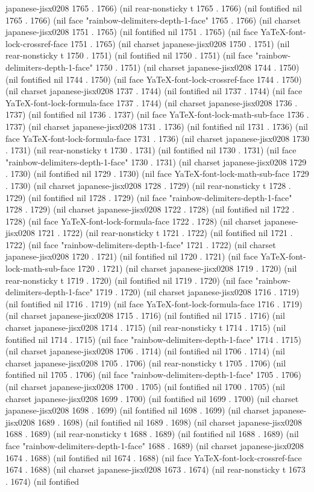 japanese-jisx0208 1765 . 1766) (nil rear-nonsticky t 1765 . 1766) (nil fontified nil 1765 . 1766) (nil face "rainbow-delimiters-depth-1-face" 1765 . 1766) (nil charset japanese-jisx0208 1751 . 1765) (nil fontified nil 1751 . 1765) (nil face YaTeX-font-lock-crossref-face 1751 . 1765) (nil charset japanese-jisx0208 1750 . 1751) (nil rear-nonsticky t 1750 . 1751) (nil fontified nil 1750 . 1751) (nil face "rainbow-delimiters-depth-1-face" 1750 . 1751) (nil charset japanese-jisx0208 1744 . 1750) (nil fontified nil 1744 . 1750) (nil face YaTeX-font-lock-crossref-face 1744 . 1750) (nil charset japanese-jisx0208 1737 . 1744) (nil fontified nil 1737 . 1744) (nil face YaTeX-font-lock-formula-face 1737 . 1744) (nil charset japanese-jisx0208 1736 . 1737) (nil fontified nil 1736 . 1737) (nil face YaTeX-font-lock-math-sub-face 1736 . 1737) (nil charset japanese-jisx0208 1731 . 1736) (nil fontified nil 1731 . 1736) (nil face YaTeX-font-lock-formula-face 1731 . 1736) (nil charset japanese-jisx0208 1730 . 1731) (nil rear-nonsticky t 1730 . 1731) (nil fontified nil 1730 . 1731) (nil face "rainbow-delimiters-depth-1-face" 1730 . 1731) (nil charset japanese-jisx0208 1729 . 1730) (nil fontified nil 1729 . 1730) (nil face YaTeX-font-lock-math-sub-face 1729 . 1730) (nil charset japanese-jisx0208 1728 . 1729) (nil rear-nonsticky t 1728 . 1729) (nil fontified nil 1728 . 1729) (nil face "rainbow-delimiters-depth-1-face" 1728 . 1729) (nil charset japanese-jisx0208 1722 . 1728) (nil fontified nil 1722 . 1728) (nil face YaTeX-font-lock-formula-face 1722 . 1728) (nil charset japanese-jisx0208 1721 . 1722) (nil rear-nonsticky t 1721 . 1722) (nil fontified nil 1721 . 1722) (nil face "rainbow-delimiters-depth-1-face" 1721 . 1722) (nil charset japanese-jisx0208 1720 . 1721) (nil fontified nil 1720 . 1721) (nil face YaTeX-font-lock-math-sub-face 1720 . 1721) (nil charset japanese-jisx0208 1719 . 1720) (nil rear-nonsticky t 1719 . 1720) (nil fontified nil 1719 . 1720) (nil face "rainbow-delimiters-depth-1-face" 1719 . 1720) (nil charset japanese-jisx0208 1716 . 1719) (nil fontified nil 1716 . 1719) (nil face YaTeX-font-lock-formula-face 1716 . 1719) (nil charset japanese-jisx0208 1715 . 1716) (nil fontified nil 1715 . 1716) (nil charset japanese-jisx0208 1714 . 1715) (nil rear-nonsticky t 1714 . 1715) (nil fontified nil 1714 . 1715) (nil face "rainbow-delimiters-depth-1-face" 1714 . 1715) (nil charset japanese-jisx0208 1706 . 1714) (nil fontified nil 1706 . 1714) (nil charset japanese-jisx0208 1705 . 1706) (nil rear-nonsticky t 1705 . 1706) (nil fontified nil 1705 . 1706) (nil face "rainbow-delimiters-depth-1-face" 1705 . 1706) (nil charset japanese-jisx0208 1700 . 1705) (nil fontified nil 1700 . 1705) (nil charset japanese-jisx0208 1699 . 1700) (nil fontified nil 1699 . 1700) (nil charset japanese-jisx0208 1698 . 1699) (nil fontified nil 1698 . 1699) (nil charset japanese-jisx0208 1689 . 1698) (nil fontified nil 1689 . 1698) (nil charset japanese-jisx0208 1688 . 1689) (nil rear-nonsticky t 1688 . 1689) (nil fontified nil 1688 . 1689) (nil face "rainbow-delimiters-depth-1-face" 1688 . 1689) (nil charset japanese-jisx0208 1674 . 1688) (nil fontified nil 1674 . 1688) (nil face YaTeX-font-lock-crossref-face 1674 . 1688) (nil charset japanese-jisx0208 1673 . 1674) (nil rear-nonsticky t 1673 . 1674) (nil fontified 